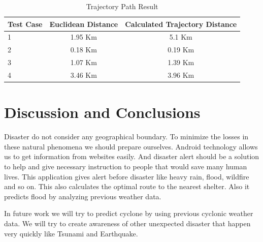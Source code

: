 \documentclass[conference]{IEEEtran}
\begin{document}
\begin{table}[htp]
\centering
\caption{Trajectory Path Result}

\begin{tabular}{|l|c|c|}
\hline
Test Case & Euclidean Distance & Calculated Trajectory Distance \\
\hline
1 & 1.95 Km & 5.1 Km \\
\hline
2 & 0.18 Km & 0.19 Km  \\
\hline

3 & 1.07 Km & 1.39 Km \\
\hline

4 & 3.46 Km & 3.96 Km\\
\hline

\end{tabular}
\label{tab:resultclass}
\end{table}



\section{Discussion and Conclusions}
\label{conclusion}

Disaster do not consider any geographical boundary. To minimize the losses in these natural phenomena we should prepare ourselves. Android technology allows us to get information from websites easily. And disaster alert should be a solution to help and give necessary instruction to people that would save many human lives. This application gives alert before disaster like heavy rain, flood, wildfire and so on. This also calculates the optimal route to the nearest shelter. Also it predicts flood by analyzing previous weather data. 

In future work we will try to predict cyclone by using previous cyclonic weather data. We will try to create awareness of other unexpected disaster that happen very quickly like Tsunami and Earthquake.  





%
%

%

\balance

\end{document}
